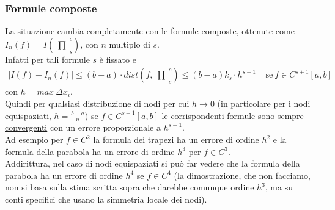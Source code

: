 \documentclass[12pt,a4paper]{article}
\newcommand{\inter}{\begin{matrix}\prod\end{matrix}}
\begin{document}
\subsubsection{Formule composte}
La situazione cambia completamente con le formule composte, ottenute come $I_n(f)=I(\inter_s^c)$, con $n$ multiplo di $s$.\\Infatti per tali formule $s$ è fissato e
\begin{equation*}
\begin{split}
    |I(f)-I_n(f)|\leq(b-a)\cdot dist(f,\inter_s^c)\leq(b-a)k_s\cdot h^{s+1} \  \  \  \  \  \text{se} \ f\in C^{s+1}[a,b]
\end{split}
\end{equation*}
con $h = max \ \Delta x_i$.\\
Quindi per qualsiasi distribuzione di nodi per cui $h\rightarrow0$ (in particolare per i nodi equispaziati, $h=\frac{b-a}{n}$) se $f\in C^{s+1}[a,b]$ le corrispondenti formule sono \uline{sempre convergenti} con un errore proporzionale a $h^{s+1}$.\\Ad esempio per $f\in C^2$ la formula dei trapezi ha un errore di ordine $h^2$ e la formula della parabola ha un errore di ordine $h^3$ per $f\in C^3$.\\
Addirittura, nel caso di nodi equispaziati si può far vedere che la formula della parabola ha un errore di ordine $h^4$ se $f\in C^4$ (la dimostrazione, che non facciamo, non si basa sulla stima scritta sopra che darebbe comunque ordine $h^3$, ma su conti specifici che usano la simmetria locale dei nodi).
\end{document}
